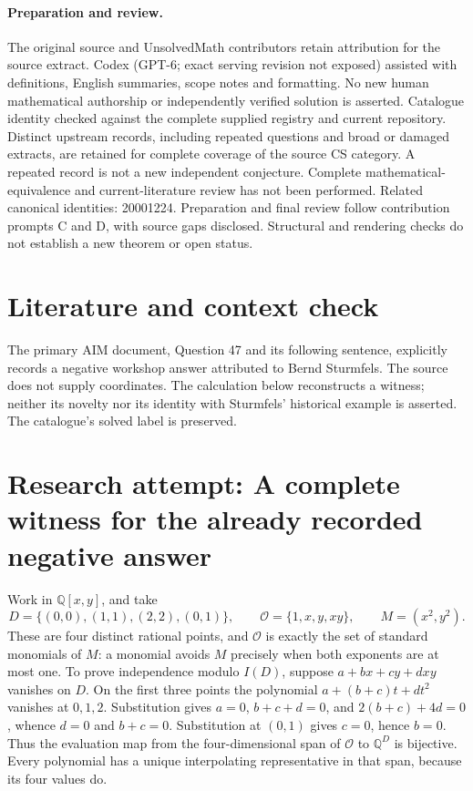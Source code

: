 \documentclass[11pt]{article}
\begin{document}
\paragraph{Preparation and review.}
The original source and UnsolvedMath contributors retain attribution for the source extract. Codex (GPT-6; exact serving revision not exposed) assisted with definitions, English summaries, scope notes and formatting. No new human mathematical authorship or independently verified solution is asserted. Catalogue identity checked against the complete supplied registry and current repository. Distinct upstream records, including repeated questions and broad or damaged extracts, are retained for complete coverage of the source CS category. A repeated record is not a new independent conjecture. Complete mathematical-equivalence and current-literature review has not been performed. Related canonical identities: 20001224. Preparation and final review follow contribution prompts C and D, with source gaps disclosed. Structural and rendering checks do not establish a new theorem or open status.
\label{end:statement}

\section{Literature and context check}
The primary AIM document, Question 47 and its following sentence, explicitly records a negative workshop answer attributed to Bernd Sturmfels. The source does not supply coordinates. The calculation below reconstructs a witness; neither its novelty nor its identity with Sturmfels' historical example is asserted. The catalogue's solved label is preserved.
\section{Research attempt: A complete witness for the already recorded negative answer}
Work in $\mathbb Q[x,y]$, and take
\[
D=\{(0,0),(1,1),(2,2),(0,1)\},\qquad
\mathcal O=\{1,x,y,xy\},\qquad M=(x^2,y^2).
\]
These are four distinct rational points, and $\mathcal O$ is exactly the set of standard monomials of $M$: a monomial avoids $M$ precisely when both exponents are at most one. To prove independence modulo $I(D)$, suppose $a+bx+cy+dxy$ vanishes on $D$. On the first three points the polynomial $a+(b+c)t+dt^2$ vanishes at $0,1,2$. Substitution gives $a=0$, $b+c+d=0$, and $2(b+c)+4d=0$, whence $d=0$ and $b+c=0$. Substitution at $(0,1)$ gives $c=0$, hence $b=0$. Thus the evaluation map from the four-dimensional span of $\mathcal O$ to $\mathbb Q^D$ is bijective. Every polynomial has a unique interpolating representative in that span, because its four values do.
\end{document}

